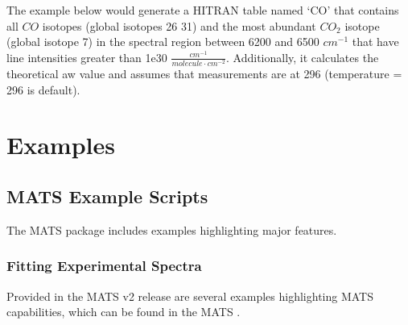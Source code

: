 \documentclass[letterpaper,10pt,english]{sphinxmanual}
\begin{document}
\sphinxAtStartPar
The example below would generate a HITRAN table named ‘CO’ that contains all \(CO\) isotopes (global isotopes 26 \sphinxhyphen{} 31) and the most abundant \(CO_{2}\) isotope (global isotope 7) in the spectral region between 6200 and 6500 \(cm^{-1}\) that have line intensities greater than 1e\sphinxhyphen{}30 \(\frac{cm^{-1}}{molecule \cdot cm^{-2}}\).   Additionally, it calculates the theoretical aw value and assumes that measurements are at 296 (temperature = 296 is default).

\begin{sphinxVerbatim}[commandchars=\\\{\}]
  
  \PYG{p}{[}    \PYG{p}{]}
  
  
  

          
\end{sphinxVerbatim}

\sphinxstepscope


\section{Examples}
\label{\detokenize{Examples:examples}}\label{\detokenize{Examples::doc}}

\subsection{MATS Example Scripts}
\label{\detokenize{Examples:mats-example-scripts}}
\sphinxAtStartPar
The MATS package includes examples highlighting major features.

\sphinxstepscope


\subsubsection{Fitting Experimental Spectra}
\label{\detokenize{Fitting Experimental Spectra:fitting-experimental-spectra}}\label{\detokenize{Fitting Experimental Spectra::doc}}
\sphinxAtStartPar
Provided in the MATS v2 release are several examples highlighting MATS capabilities, which can be found in the MATS .
\end{document}
